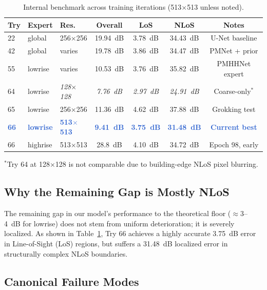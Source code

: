 \documentclass[11pt,a4paper]{article}
\newcommand{\ours}[1]{\textcolor{highlight}{\textbf{#1}}}
\begin{document}
\begin{table}[h!]
\centering
\caption{Internal benchmark across training iterations (513$\times$513 unless noted).}
\label{tab:progress}
\begin{center}
    

\begin{tabular}{lllcccc}
\toprule
\textbf{Try} & \textbf{Expert} & \textbf{Res.} & \textbf{Overall} & \textbf{LoS} & \textbf{NLoS} & \textbf{Notes} \\
\midrule
22 & global & 256$\times$256 & 19.94~dB & 3.78~dB & 34.43~dB & U-Net baseline \\
42 & global & varies & 19.78~dB & 3.86~dB & 34.47~dB & PMNet + prior \\
55 & lowrise & varies & 10.53~dB & 3.76~dB & 35.82~dB & PMHHNet expert \\
64 & lowrise & \textit{128$\times$128} & \textit{7.76~dB} & \textit{2.97~dB} & \textit{24.91~dB} & Coarse-only$^*$ \\
65 & lowrise & 256$\times$256 & 11.36~dB & 4.62~dB & 37.88~dB & Grokking test \\
\midrule
\ours{66} & \ours{lowrise} & \ours{513$\times$513} & \ours{9.41~dB} & \ours{3.75~dB} & \ours{31.48~dB} & \ours{Current best} \\
66 & highrise & 513$\times$513 & 28.8~dB & 4.10~dB & 34.72~dB & Epoch 98, early \\
\bottomrule
\end{tabular}
\end{center}
\end{table}
\footnotesize $^*$Try 64 at 128$\times$128 is not comparable due to building-edge NLoS pixel blurring.
\normalsize
\subsection{Why the Remaining Gap is Mostly NLoS}

The remaining gap in our model's performance to the theoretical floor ($\approx$3--4~dB for lowrise) does not stem from uniform deterioration; it is severely localized. As shown in Table~\ref{tab:progress}, Try 66 achieves a highly accurate 3.75~dB error in Line-of-Sight (LoS) regions, but suffers a 31.48~dB localized error in structurally complex NLoS boundaries. 

\subsection{Canonical Failure Modes}
\end{document}
